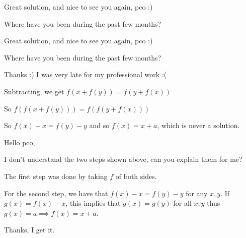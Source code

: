 \begin{solution}
	Great solution, and nice to see you again, pco  :) 

Where have you been during the past few months?
\end{solution}



\begin{solution}
	\begin{tcolorbox}Great solution, and nice to see you again, pco  :) 

Where have you been during the past few months?\end{tcolorbox}
Thanks :)
I was very late for my professional work :(
\end{solution}



\begin{solution}
	\begin{tcolorbox}
Subtracting, we get $f(x+f(y))=f(y+f(x))$

So $f(f(x+f(y)))=f(f(y+f(x)))$\end{tcolorbox}

\begin{tcolorbox}
So $f(x)-x=f(y)-y$ and so $f(x)=x+a$, which is never a solution.
\end{tcolorbox}

Hello pco,

I don't understand the two steps shown above, can you explain them for me?
\end{solution}



\begin{solution}
	The first step was done by taking $f$ of both sides.

For the second step, we have that $f(x)-x=f(y)-y$ for any $x, y$. If $g(x)=f(x)-x$, this implies that $g(x)=g(y)$ for all $x, y$ thus $g(x)=a \implies f(x)=x+a$.
\end{solution}



\begin{solution}
	Thanks, I get it.
\end{solution}



